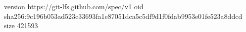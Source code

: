 version https://git-lfs.github.com/spec/v1
oid sha256:9c196b053ad523c33693fa1e87051dca5c5df9d1f0fdab9953e01fe523a8ddcd
size 421593

